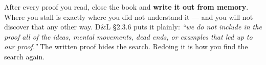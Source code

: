 \begin{dobox}[title={The one habit that matters}]
After every proof you read, close the book and \textbf{write it out from memory}. Where you stall is
exactly where you did not understand it --- and you will not discover that any other way. D\&L
§2.3.6 puts it plainly: \emph{``we do not include in the proof all of the ideas, mental movements,
dead ends, or examples that led up to our proof.''} The written proof hides the search. Redoing it
is how you find the search again.
\end{dobox}
